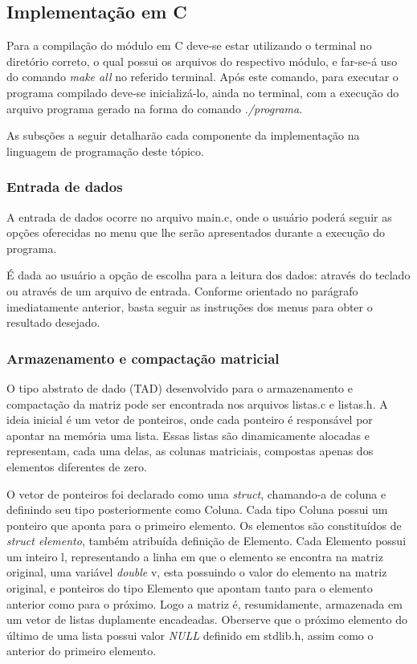 \documentclass[
	article,			%
	11pt,				%
	oneside,			%
	a4paper,			%
	english,			%
	brazil,				%
	sumario=tradicional
	]{abntex2}
\begin{document}
\subsection{Implementação em C}

Para a compilação do módulo em C deve-se estar utilizando o terminal no diretório correto, o qual possui os arquivos do respectivo módulo, e far-se-á uso do comando \emph{make all} no referido terminal. Após este comando, para executar o programa compilado deve-se inicializá-lo, ainda no terminal, com a execução do arquivo programa gerado na forma do comando \emph{./programa}.

As subsções a seguir detalharão cada componente da implementação na linguagem de programação deste tópico.

\subsubsection{Entrada de dados}

A entrada de dados ocorre no arquivo main.c, onde o usuário poderá seguir as opções oferecidas no menu que lhe serão apresentados durante a execução do programa. 

É dada ao usuário a opção de escolha para a leitura dos dados: através do teclado ou através de um arquivo de entrada. Conforme orientado no parágrafo imediatamente anterior, basta seguir as instruções dos menus para obter o resultado desejado.

\subsubsection{Armazenamento e compactação matricial}

O tipo abstrato de dado (TAD) desenvolvido para o armazenamento e compactação da matriz pode ser encontrada nos arquivos listas.c e listas.h. A ideia inicial é um vetor de ponteiros, onde cada ponteiro é responsável por apontar na memória uma lista. Essas listas são dinamicamente alocadas e representam, cada uma delas, as colunas matriciais, compostas apenas dos elementos diferentes de zero.

O vetor de ponteiros foi declarado como uma \emph{struct}, chamando-a de coluna e definindo seu tipo posteriormente como Coluna. Cada tipo Coluna possui um ponteiro que aponta para o primeiro elemento. Os elementos são constituídos de \emph{struct elemento}, também atribuída definição de Elemento. Cada Elemento possui um inteiro l, representando a linha em que o elemento se encontra na matriz original, uma variável \emph{double} v, esta possuindo o valor do elemento na matriz original, e ponteiros do tipo Elemento que apontam tanto para o elemento anterior como para o próximo. Logo a matriz é, resumidamente, armazenada em um vetor de listas duplamente encadeadas. Oberserve que o próximo elemento do último de uma lista possui valor \emph{NULL} definido em stdlib.h, assim como o anterior do primeiro elemento.
\end{document}
